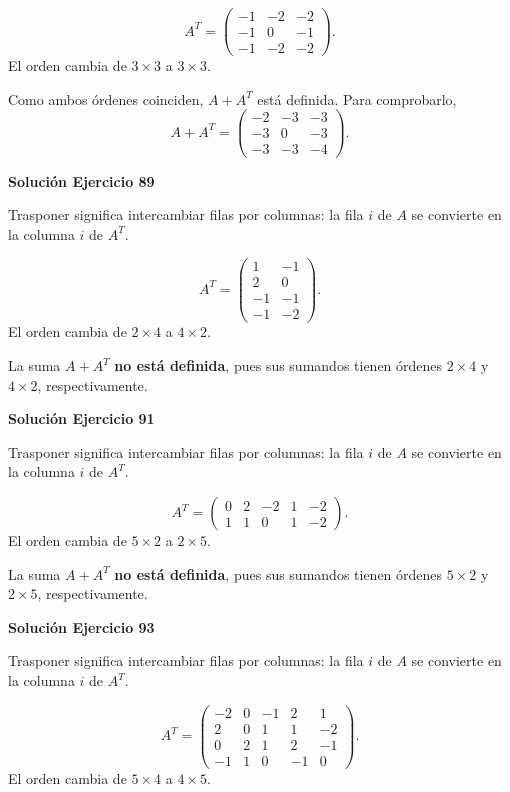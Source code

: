 \documentclass[12pt]{article}
\begin{document}
\[
A^T=\begin{pmatrix}-1&-2&-2\\-1&0&-1\\-1&-2&-2\end{pmatrix}.
\]
El orden cambia de $3\times3$ a $3\times3$.

Como ambos órdenes coinciden, $A+A^T$ está definida. Para comprobarlo,
\[
A+A^T=\begin{pmatrix}-2&-3&-3\\-3&0&-3\\-3&-3&-4\end{pmatrix}.
\]

\par\bigskip\noindent\textbf{Solución Ejercicio 89}\par\nobreak
Trasponer significa intercambiar filas por columnas: la fila $i$ de $A$ se convierte en la columna $i$ de $A^T$.

\[
A^T=\begin{pmatrix}1&-1\\2&0\\-1&-1\\-1&-2\end{pmatrix}.
\]
El orden cambia de $2\times4$ a $4\times2$.

La suma $A+A^T$ \textbf{no está definida}, pues sus sumandos tienen órdenes $2\times4$ y $4\times2$, respectivamente.


\par\bigskip\noindent\textbf{Solución Ejercicio 91}\par\nobreak
Trasponer significa intercambiar filas por columnas: la fila $i$ de $A$ se convierte en la columna $i$ de $A^T$.

\[
A^T=\begin{pmatrix}0&2&-2&1&-2\\1&1&0&1&-2\end{pmatrix}.
\]
El orden cambia de $5\times2$ a $2\times5$.

La suma $A+A^T$ \textbf{no está definida}, pues sus sumandos tienen órdenes $5\times2$ y $2\times5$, respectivamente.


\par\bigskip\noindent\textbf{Solución Ejercicio 93}\par\nobreak
Trasponer significa intercambiar filas por columnas: la fila $i$ de $A$ se convierte en la columna $i$ de $A^T$.

\[
A^T=\begin{pmatrix}-2&0&-1&2&1\\2&0&1&1&-2\\0&2&1&2&-1\\-1&1&0&-1&0\end{pmatrix}.
\]
El orden cambia de $5\times4$ a $4\times5$.
\end{document}
